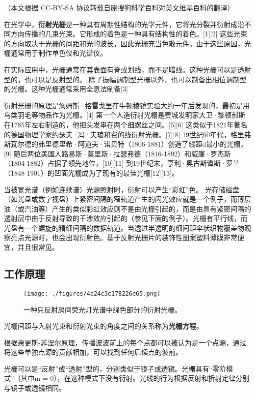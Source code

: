 
（本文根据 CC-BY-SA 协议转载自原搜狗科学百科对英文维基百科的翻译）

在光学中，\textbf{衍射光栅}是一种具有周期性结构的光学元件，它将光分裂并衍射成沿不同方向传播的几束光束。它形成的着色是一种具有结构性的着色。[1][2] 这些光束的方向取决于光栅的间距和光的波长，因此光栅充当色散元件。由于这些原因，光栅通常用于制作单色仪和光谱仪。

在实际应用中，光栅通常在其表面有脊或划线，而不是暗线。这种光栅可以是透射型的，也可以是反射型的。 除了振幅调制型光栅以外，也可以制备出相位调制型的光栅。这种光栅通常采用全息法制备[3]

衍射光栅的原理是詹姆斯·格雷戈里在牛顿棱镜实验大约一年后发现的，最初是用鸟类羽毛等物品作为光栅。[4] 第一个人造衍射光栅是费城发明家大卫·黎顿郝斯在1785年左右制造的，他把头发串在两个细螺丝之间。[5][6] 这类似于1821年著名的德国物理学家约瑟夫·冯·夫琅和费的线衍射光栅。[7][8] 19世纪60年代，格里弗斯瓦尔德的弗里德里希·阿道夫·诺贝特（1806-1881）创造了线距d最小的光栅，[9] 随后两位美国人路易斯·莫里斯·拉瑟弗德（1816-1892）和威廉·罗杰斯（1804-1882）占据了领先地位，[10][11] 到19世纪末，亨利·奥古斯谭斯·罗兰（1848-1901）的凹面光栅成为了现有的最佳光栅[12][13]。

当被宽光谱（例如连续谱）光源照射时，衍射可以产生“彩虹”色。 光存储磁盘（如光盘或数字视盘）上紧密间隔的窄轨道产生的闪光效应就是一个例子，而薄层油（或汽油等）产生的类似彩虹效应则不是由光栅引起的，而是由具有紧密间隔的透射层中由于反射导致的干涉效应引起的（参见下面的例子）。光栅有平行线，而光盘有一个螺旋的精细间隔的数据轨道。当透过半透明的细间距伞状织物覆盖物观察亮点光源时，也会出现衍射色。基于反射光栅片的装饰性图案塑料薄膜非常便宜，并且很常见。

\subsection{工作原理}
\begin{figure}[ht]
\centering
\texttt{[image: ./figures/4a24c3c178226e65.png]}
\caption{一种只反射房间荧光灯光谱中绿色部分的衍射光栅。} \label{fig_YSGS_1}
\end{figure}

光栅间距与入射光束和衍射光束的角度之间的关系称为\textbf{光栅方程}。

根据惠更斯-菲涅尔原理，传播波波前上的每个点都可以被认为是一个点源，通过将这些单独点源的贡献相加，可以找到任何后续点的波前。

光栅可以是“反射”或“透射”型的，分别类似于镜子或透镜。光栅具有“零阶模式”（其中m = 0），在这种模式下没有衍射。光线的行为根据反射和折射定律分别与镜子或透镜相同。

